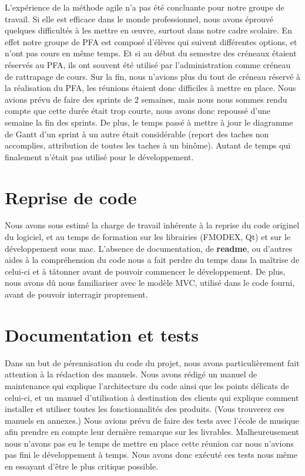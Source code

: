 L’expérience de la méthode agile n’a pas été concluante pour notre groupe de travail. Si elle est efficace dans le monde professionnel, nous avons éprouvé quelques difficultés à les mettre en œuvre, surtout dans notre cadre scolaire. En effet notre groupe de PFA est composé d’élèves qui suivent différentes options, et n’ont pas cours en même temps. Et si au début du semestre des créneaux étaient réservés au PFA, ils ont souvent été utilisé par l’administration comme créneau de rattrapage de cours. Sur la fin, nous n’avions plus du tout de créneau réservé à la réalisation du PFA, les réunions étaient donc difficiles à mettre en place. 
Nous avions prévu de faire des sprints de 2 semaines, mais nous nous sommes rendu compte que cette durée était trop courte, nous avons donc repoussé d’une semaine la fin des sprints. 
De plus, le temps passé à mettre à jour le diagramme de Gantt d’un sprint à un autre était considérable (report des taches non accomplies, attribution de toutes les taches à un binôme). Autant de temps qui finalement n’était pas utilisé pour le développement. 

\section{Reprise de code}

Nous avons sous estimé la charge de travail inhérente à la reprise du code originel du logiciel, et au temps de formation sur les librairies (FMODEX, Qt) et sur le développement sous mac. 
L’absence de documentation, de \textbf{readme}, ou d’autres aides à la compréhension du code nous a fait perdre du temps dans la maîtrise de celui-ci et à tâtonner avant de pouvoir commencer le développement.
De plus, nous avons dû nous familiariser avec le modèle MVC, utilisé dans le code fourni, avant de pouvoir interragir proprement.

\section{Documentation et tests}

Dans un but de pérennisation du code du projet, nous avons particulièrement fait attention à la rédaction des manuels. 
Nous avons rédigé un manuel de maintenance qui explique l’architecture du code ainsi que les points délicats de celui-ci, et un manuel d’utilisation à destination des clients qui explique comment installer et utiliser toutes les fonctionnalités des produits. (Vous trouverez ces manuels en annexes.)
Nous avions prévu de faire des tests avec l’école de musique afin prendre en compte leur dernière remarque sur les livrables. Malheureusement nous n’avons pas eu le temps de mettre en place cette réunion car nous n’avions pas fini le développement à temps. Nous avons donc exécuté ces tests nous même en essayant d’être le plus critique possible.
